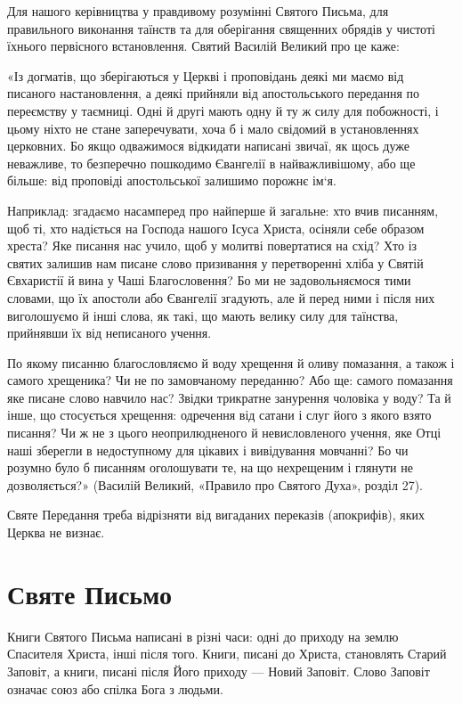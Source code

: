 \documentclass[main.tex]{subfiles}
\begin{document}
Для нашого керівництва у правдивому розумінні Святого Письма, для правильного виконання таїнств та для оберігання священних обрядів у чистоті їхнього первісного встановлення. Святий Василій Великий про це каже:
\begin{FlushRight}
    «Із догматів, що зберігаються у Церкві і проповідань деякі ми маємо від писаного настановлення, а деякі прийняли від апостольського передання по переємству у таємниці. Одні й другі мають одну й ту ж силу для побожності, і цьому ніхто не стане заперечувати, хоча б і мало свідомий в установленнях церковних. Бо якщо одважимося відкидати написані звичаї, як щось дуже неважливе, то безперечно пошкодимо Євангелії в найважливішому, або ще більше: від проповіді апостольської залишимо порожнє ім`я.

    Наприклад: згадаємо насамперед про найперше й загальне: хто вчив писанням, щоб ті, хто надіється на Господа нашого Ісуса Христа, осіняли себе образом хреста? Яке писання нас учило, щоб у молитві повертатися на схід? Хто із святих залишив нам писане слово призивання у перетворенні хліба у Святій Євхаристії й вина у Чаші Благословення? Бо ми не задовольняємося тими словами, що їх апостоли або Євангелії згадують, але й перед ними і після них виголошуємо й інші слова, як такі, що мають велику силу для таїнства, прийнявши їх від неписаного учення.

    По якому писанню благословляємо й воду хрещення й оливу помазання, а також і самого хрещеника? Чи не по замовчаному переданню? Або ще: самого помазання яке писане слово навчило нас? Звідки трикратне занурення чоловіка у воду? Та й інше, що стосується хрещення: одречення від сатани і слуг його з якого взято писання? Чи ж не з цього неоприлюдненого й невисловленого учення, яке Отці наші зберегли в недоступному для цікавих і вивідування мовчанні? Бо чи розумно було б писанням оголошувати те, на що нехрещеним і глянути не дозволяється?» (Василій Великий, «Правило про Святого Духа», розділ 27).
\end{FlushRight}

Святе Передання треба відрізняти від вигаданих переказів (апокрифів), яких Церква не визнає.
 
\section{Святе Письмо}

Книги Святого Письма написані в різні часи: одні до приходу на землю Спасителя Христа, інші після того. Книги, писані до Христа, становлять Старий Заповіт, а книги, писані після Його приходу — Новий Заповіт. Слово Заповіт означає союз або спілка Бога з людьми.
\end{document}
